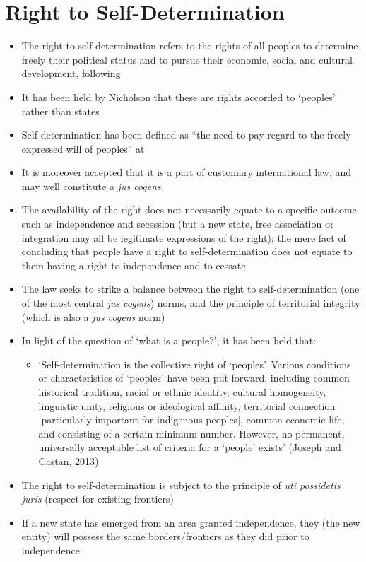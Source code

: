 \section{Right to Self-Determination}
\begin{itemize}
    \item The right to self-determination refers to the rights of all peoples to determine freely their political status and to pursue their economic, social and cultural development, following 
    \item It has been held by Nicholson that these are rights accorded to `peoples' rather than states
    \item Self-determination has been defined as ``the need to pay regard to the freely expressed will of peoples'' at 
    \item It is moreover accepted that it is a part of customary international law, and may well constitute a \textit{jus cogens}
    \item The availability of the right does not necessarily equate to a specific outcome such as independence and secession (but a new state, free association or integration may all be legitimate expressions of the right); the mere fact of concluding that people have a right to self-determination does not equate to them having a right to independence and to cessate
    \item The law seeks to strike a balance between the right to self-determination (one of the most central \textit{jus cogens}) norms, and the principle of territorial integrity (which is also a \textit{jus cogens} norm)
    \item In light of the question of `what is a people?', it has been held that:
    \begin{itemize}
        \item `Self-determination is the collective right of `peoples'. Various conditions or characteristics of `peoples' have been put forward, including common historical tradition, racial or ethnic identity, cultural homogeneity, linguistic unity, religious or ideological affinity, territorial connection [particularly important for indigenous peoples], common economic life, and consisting of a certain minimum number. However, no permanent, universally acceptable list of criteria for a `people' exists' (Joseph and Castan, 2013)
    \end{itemize}
    \item The right to self-determination is subject to the principle of \textit{uti possidetis juris} (respect for existing frontiers)
    \item If a new state has emerged from an area granted independence, they (the new entity) will possess the same borders/frontiers as they did prior to independence
\end{itemize}

